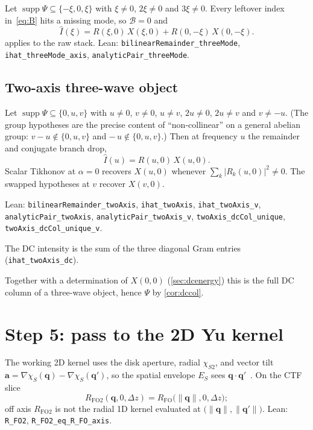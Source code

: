 \documentclass[11pt,a4paper]{article}
\theoremstyle{definition}
\theoremstyle{remark}
\newcommand{\abs}[1]{\lvert#1\rvert}
\newcommand{\norm}[1]{\lVert#1\rVert}
\newcommand{\Dz}{\Delta z}
\newcommand{\RFO}{R_{\mathrm{FO}}}
\newcommand{\RFOII}{R_{\mathrm{FO2}}}
\begin{document}
Let $\operatorname{supp}\Psi\subseteq\{-\xi,0,\xi\}$ with
$\xi\neq 0$, $2\xi\neq 0$ and $3\xi\neq 0$.
Every leftover index in~\eqref{eq:B} hits a missing mode, so
$\mathcal{B}=0$ and
\begin{equation}
\label{eq:threemode}
\hat I(\xi)
=R(\xi,0)\,X(\xi,0)+R(0,-\xi)\,X(0,-\xi).
\end{equation}
 applies to the raw stack.
Lean: \texttt{bilinearRemainder\_threeMode},
\texttt{ihat\_threeMode\_axis}, \texttt{analyticPair\_threeMode}.

\subsection{Two-axis three-wave object}
\label{sec:twoaxis}

Let $\operatorname{supp}\Psi\subseteq\{0,u,v\}$ with
$u\neq 0$, $v\neq 0$, $u\neq v$, $2u\neq 0$, $2u\neq v$ and
$v\neq -u$.
(The group hypotheses are the precise content of ``non-collinear'' on
a general abelian group: $v-u\notin\{0,u,v\}$ and $-\,u\notin\{0,u,v\}$.)
Then at frequency $u$ the remainder and conjugate branch drop,
\begin{equation}
\label{eq:twoaxis}
\hat I(u)=R(u,0)\,X(u,0).
\end{equation}
Scalar Tikhonov at $\alpha=0$ recovers $X(u,0)$ whenever
$\sum_k\abs{R_k(u,0)}^2\neq 0$.
The swapped hypotheses at $v$ recover $X(v,0)$.
{\raggedright
Lean: \texttt{bilinearRemainder\_twoAxis}, \texttt{ihat\_twoAxis},
\texttt{ihat\_twoAxis\_v}, \texttt{analyticPair\_twoAxis},
\texttt{analyticPair\_twoAxis\_v}, \texttt{twoAxis\_dcCol\_unique},
\texttt{twoAxis\_dcCol\_unique\_v}.
\par}
The DC intensity is the sum of the three diagonal Gram entries
(\texttt{ihat\_twoAxis\_dc}).

Together with a determination of $X(0,0)$ (\cref{sec:dcenergy}) this
is the full DC column of a three-wave object, hence $\Psi$ by
\cref{cor:dccol}.

\section{Step 5: pass to the 2D Yu kernel}
\label{sec:kernel2}

The working 2D kernel uses the disk aperture, radial
$\chi_{S2}$, and vector tilt
$\mathbf{a}=\nabla\chi_S(\mathbf{q})-\nabla\chi_S(\mathbf{q}')$, so
the spatial envelope $E_S$ sees $\mathbf{q}\cdot\mathbf{q}'$~\cite{Yu2019,Lau2026proofs}.
On the CTF slice
\begin{equation}
\label{eq:axis}
\RFOII(\mathbf{q},0,\Dz)
=\RFO\bigl(\norm{\mathbf{q}},0,\Dz\bigr);
\end{equation}
off axis $\RFOII$ is not the radial 1D kernel evaluated at
$\bigl(\norm{\mathbf{q}},\norm{\mathbf{q}'}\bigr)$.
Lean: \texttt{R\_FO2}, \texttt{R\_FO2\_eq\_R\_FO\_axis}.
\end{document}

